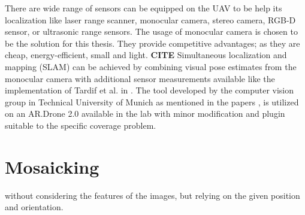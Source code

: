  
 There are wide range of sensors can be equipped on the UAV to be help its localization like laser range scanner, monocular camera, stereo camera, RGB-D sensor, or ultrasonic range sensors. The usage of monocular camera is chosen to be the solution for this thesis. They provide competitive advantages; as they are cheap, energy-efficient, small and light. \textbf{CITE} Simultaneous localization and mapping (SLAM) can be achieved by combining visual pose estimates from the monocular camera  with additional sensor measurements available like the implementation of Tardif et al. in \cite{tardif2008monocular}. The tool developed by the computer vision group in Technical University of Munich as mentioned in the papers \cite{engel14ras,engel12iros}, is utilized on an AR.Drone 2.0 available in the lab with minor modification and plugin suitable to the specific coverage problem.
 
\section{Mosaicking}
without considering the features of the images, but relying on the given position and orientation. 
 

